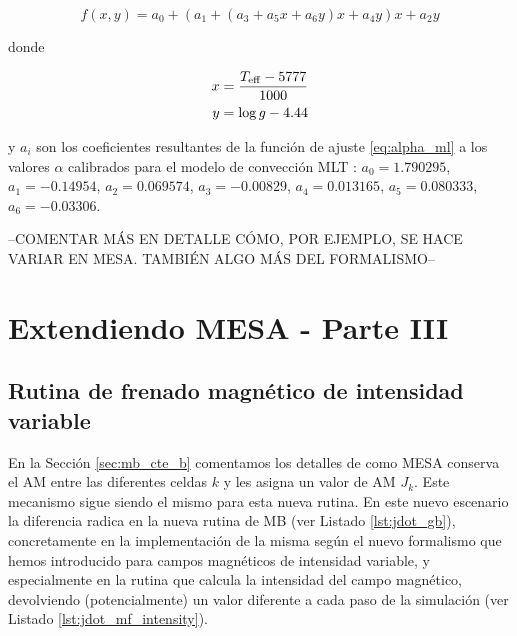 \begin{equation}
	f(x,y) = a_0 + (a_1 + (a_3 + a_5x +a_6y)x + a_4y)x + a_2y\label{eq:alpha_ml}
\end{equation}

donde

\begin{align}
	x &= \frac{T_{\mathrm{eff}}-5777}{1000} \label{eq:eq:alpha_x}\\
	y &= \mathrm{log} \, g-4.44 \label{eq:eq:alpha_y}
\end{align}

y $a_i$ son los coeficientes resultantes de la función de ajuste \ref{eq:alpha_ml} a los valores $\alpha$ calibrados para el modelo de convección MLT \citep{Sonoi2018}: $a_0=1.790295$, $a_1=-0.14954$, $a_2=0.069574$, $a_3=-0.00829$, $a_4=0.013165$, $a_5=0.080333$, $a_6=-0.03306$. \par
--COMENTAR MÁS EN DETALLE CÓMO, POR EJEMPLO, SE HACE VARIAR EN MESA. TAMBIÉN ALGO MÁS DEL FORMALISMO--



\section{Extendiendo MESA - Parte III}
\subsection{Rutina de frenado magnético de intensidad variable} \label{sec:mb_var_b}
En la Sección \ref{sec:mb_cte_b} comentamos los detalles de como MESA conserva el AM entre las diferentes celdas $k$ y les asigna un valor de AM $J_k$. Este mecanismo sigue siendo el mismo para esta nueva rutina. En este nuevo escenario la diferencia radica en la nueva rutina de MB (ver Listado \ref{lst:jdot_gb}), concretamente en la implementación de la misma según el nuevo formalismo que hemos introducido para campos magnéticos de intensidad variable, y especialmente en la rutina que calcula la intensidad del campo magnético, devolviendo (potencialmente) un valor diferente a cada paso de la simulación (ver Listado \ref{lst:jdot_mf_intensity}).\par

